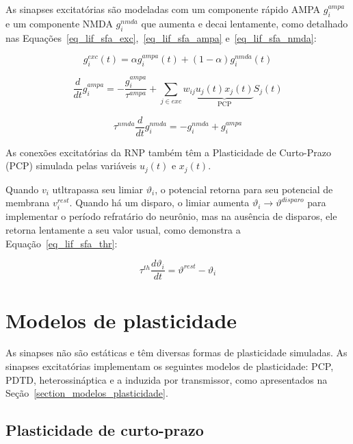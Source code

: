 As sinapses excitatórias são modeladas com um componente rápido AMPA $g_i^{ampa}$ e um componente NMDA $g_i^{nmda}$ que aumenta e
decai lentamente, como detalhado nas Equações~\ref{eq_lif_sfa_exc},~\ref{eq_lif_sfa_ampa} e~\ref{eq_lif_sfa_nmda}:

\begin{equation}
\label{eq_lif_sfa_exc}
g_i^{exc}(t) = \alpha g_i^{ampa}(t) + (1-\alpha)g_i^{nmda}(t)
\end{equation}

\begin{equation}
\label{eq_lif_sfa_ampa}
\frac{d}{dt}g_i^{ampa} = -\frac{g_i^{ampa}}{\tau^{ampa}} + \sum_{j\in exc}{w_{ij} 
\underbrace{u_j(t)x_j(t)}_{\text{PCP}}
S_j(t)}
\end{equation}

\begin{equation}
\label{eq_lif_sfa_nmda}
\tau^{nmda} \frac{d}{dt}g_i^{nmda} = -g_i^{nmda} + g_i^{ampa}
\end{equation}

As conexões excitatórias da RNP também têm a Plasticidade de Curto-Prazo (PCP) simulada pelas variáveis $u_j(t)$ e $x_j(t)$.

Quando $v_i$ utltrapassa seu limiar $\vartheta_i$, o potencial retorna para seu potencial de membrana $v_i^{rest}$. Quando há um
disparo, o limiar aumenta $\vartheta_i \rightarrow \vartheta^{disparo}$ para implementar o período refratário do neurônio, mas na
ausência de disparos, ele retorna lentamente a seu valor usual, como demonstra a Equação~\ref{eq_lif_sfa_thr}:

\begin{equation}
\label{eq_lif_sfa_thr}
\tau^{th}\frac{d\vartheta_i}{dt} = \vartheta^{rest} - \vartheta_i
\end{equation}


\section{Modelos de plasticidade}

As sinapses não são estáticas e têm diversas formas de plasticidade simuladas. As sinapses excitatórias implementam os seguintes
modelos de plasticidade: PCP, PDTD, heterossináptica e a induzida por transmissor, como apresentados na
Seção~\ref{section_modelos_plasticidade}.


\subsection{Plasticidade de curto-prazo}

